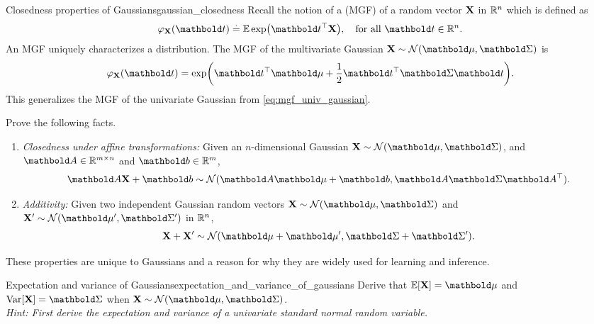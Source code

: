 \begin{nexercise}{Closedness properties of Gaussians}{gaussian_closedness}
  Recall the notion of a  (MGF) of a random vector $\mathbf{X}$ in $\mathbb{R}^n$ which is defined as \begin{align}
    \varphi_{\rX}(\vt) \defeq \E*{\exp\parentheses*{\transpose{\vt}\rX}}, \quad\text{for all $\vt \in \R^n$}. \label{eq:mgf}
  \end{align}
  An MGF uniquely characterizes a distribution.
  The MGF of the multivariate Gaussian $\rX \sim \N{\vmu}{\mSigma}$ is \begin{align}
    \varphi_\rX(\vt) = \exp\parentheses*{\transpose{\vt}\vmu + \frac{1}{2}\transpose{\vt}\mSigma\vt}. \label{eq:mgf_gaussian}
  \end{align}
  This generalizes the MGF of the univariate Gaussian from \cref{eq:mgf_univ_gaussian}.

  Prove the following facts.
  \begin{enumerate}
    \item \emph{Closedness under affine transformations:} Given an $n$-dimensional Gaussian $\rX \sim \N{\vmu}{\mSigma}$, and ${\mA \in \R^{m \times n}}$ and $\vb \in \R^m$, \begin{align}
      \mA \rX + \vb \sim \N{\mA \vmu + \vb}{\mA \mSigma \transpose{\mA}}. \label{eq:gaussian_lin_trans}
    \end{align}

    \item \emph{Additivity:} Given two independent Gaussian random vectors ${\rX \sim \N{\vmu}{\mSigma}}$ and ${\rXp \sim \N{\vmup}{\mSigmap}}$ in $\mathbb{R}^n$, \begin{align}
      \rX + \rXp \sim \N{\vmu + \vmup}{\mSigma + \mSigmap}. \label{eq:gaussian_additivity}
    \end{align}
  \end{enumerate}

  These properties are unique to Gaussians and a reason for why they are widely used for learning and inference.
\end{nexercise}

\begin{nexercise}{Expectation and variance of Gaussians}{expectation_and_variance_of_gaussians}
  Derive that $\E{\rX} = \vmu$ and $\Var{\rX} = \mSigma$ when $\rX \sim \N{\vmu}{\mSigma}$. \\
  \textit{Hint: First derive the expectation and variance of a univariate standard normal random variable.}
\end{nexercise}

